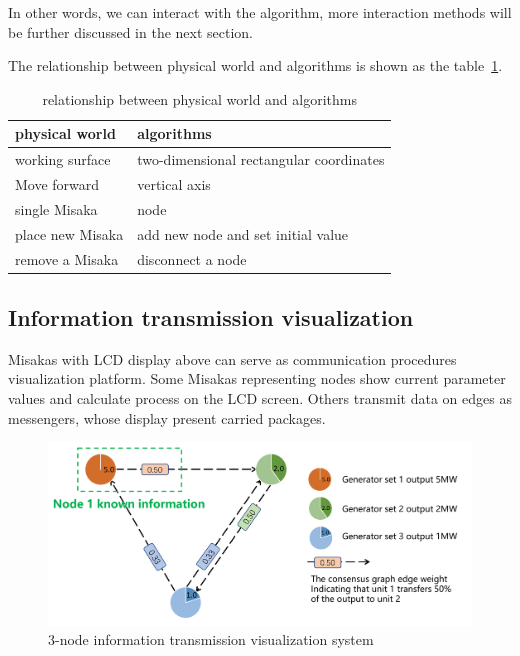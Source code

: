 \documentclass[conference]{IEEEtran}
\begin{document}
In other words, we can interact with the algorithm, more interaction methods will be further discussed in the next section.

The relationship between physical world and algorithms is shown as the table~\ref{tab:Real-Unreal}.

\begin{table}[htbp]
    \centering
    \begin{tabular}{@{}ll@{}}
    \hline
    physical world          & algorithms                               \\ \hline
    working surface         & two-dimensional rectangular coordinates  \\
    Move forward            & vertical axis                            \\
    single Misaka           & node                                     \\
    place new Misaka        & add new node and set initial value       \\
    remove a Misaka         & disconnect a node                        \\ \hline
    \end{tabular}
    \caption{relationship between physical world and algorithms}
    \label{tab:Real-Unreal}
\end{table}



\subsection{Information transmission visualization}


Misakas with LCD display above can serve as communication procedures visualization platform. Some Misakas representing nodes show current parameter values and calculate process on the LCD screen. Others transmit data on edges as messengers, whose display present carried packages.

\begin{figure}[htbp]
    \centering
    \includegraphics[width=\columnwidth]{PPT0.png}
    \caption{3-node information transmission visualization system}
    \label{fig:PPT0}
\end{figure}
\end{document}

